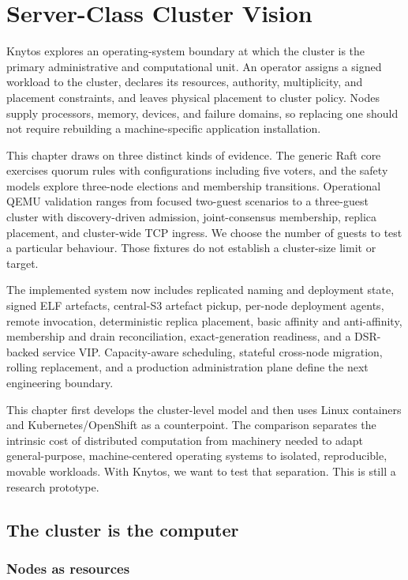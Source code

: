 \chapter{Server-Class Cluster Vision}
\label{chap:cluster-vision}

Knytos explores an operating-system boundary at which the cluster is the
primary administrative and computational unit. An operator assigns a signed
workload to the cluster, declares its resources, authority, multiplicity, and
placement constraints, and leaves physical placement to cluster policy. Nodes
supply processors, memory, devices, and failure domains, so replacing one should
not require rebuilding a machine-specific application installation.

This chapter draws on three distinct kinds of evidence.
The generic Raft core exercises quorum rules with configurations including
five voters, and the safety models explore three-node elections and membership
transitions. Operational QEMU validation ranges from focused two-guest
scenarios to a three-guest cluster with discovery-driven admission,
joint-consensus membership, replica placement, and cluster-wide TCP ingress.
We choose the number of guests to test a particular behaviour. Those fixtures
do not establish a cluster-size limit or target.

The implemented system now includes replicated naming and deployment state,
signed ELF artefacts, central-S3 artefact pickup, per-node deployment agents,
remote invocation, deterministic replica placement, basic affinity and
anti-affinity, membership and drain reconciliation, exact-generation
readiness, and a DSR-backed service VIP. Capacity-aware scheduling, stateful
cross-node migration, rolling replacement, and a production administration
plane define the next engineering boundary.

This chapter first develops the cluster-level model and then uses Linux
containers and Kubernetes/OpenShift as a counterpoint. The comparison separates
the intrinsic cost of distributed computation from machinery needed to adapt
general-purpose, machine-centered operating systems to isolated, reproducible,
movable workloads. With Knytos, we want to test that separation.
This is still a research prototype.

\section{The cluster is the computer}

\subsection{Nodes as resources}

